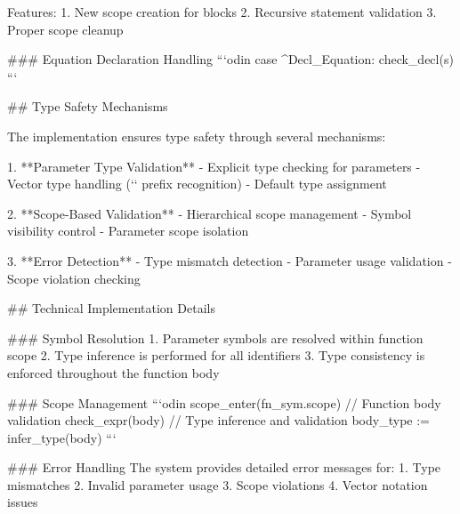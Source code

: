 Features:
1. New scope creation for blocks
2. Recursive statement validation
3. Proper scope cleanup

### Equation Declaration Handling
```odin
case ^Decl_Equation:
    check_decl(s)
```

## Type Safety Mechanisms

The implementation ensures type safety through several mechanisms:

1. **Parameter Type Validation**
   - Explicit type checking for parameters
   - Vector type handling (`\vec` prefix recognition)
   - Default type assignment

2. **Scope-Based Validation**
   - Hierarchical scope management
   - Symbol visibility control
   - Parameter scope isolation

3. **Error Detection**
   - Type mismatch detection
   - Parameter usage validation
   - Scope violation checking

## Technical Implementation Details

### Symbol Resolution
1. Parameter symbols are resolved within function scope
2. Type inference is performed for all identifiers
3. Type consistency is enforced throughout the function body

### Scope Management
```odin
scope_enter(fn_sym.scope) {
    // Function body validation
    check_expr(body)
    // Type inference and validation
    body_type := infer_type(body)
}
```

### Error Handling
The system provides detailed error messages for:
1. Type mismatches
2. Invalid parameter usage
3. Scope violations
4. Vector notation issues

